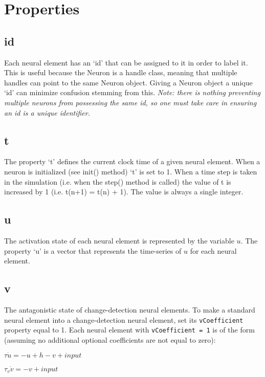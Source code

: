 \documentclass[phd, 12pt, doublespace, online]{fauthesis}
\begin{document}
\section{Properties}

\subsection{id}

Each neural element has an `id' that can be assigned to it in order to label it. This is useful because the Neuron is a handle class, meaning that multiple handles can point to the same Neuron object. Giving a Neuron object a unique `id' can minimize confusion stemming from this. \textit{Note: there is nothing preventing multiple neurons from possessing the same id, so one must take care in ensuring an id is a unique identifier.}

\subsection{t}

The property `t' defines the current clock time of a given neural element. When a neuron is initialized (see init() method) `t' is set to 1. When a time step is taken in the simulation (i.e. when the step() method is called) the value of t is increased by 1 (i.e. t(n+1) = t(n) + 1). The value is always a single integer. 

\subsection{u}

The activation state of each neural element is represented by the variable $u$. The property `u' is a vector that represents the time-series of $u$ for each neural element. 

\subsection{v}

The antagonistic state of change-detection neural elements. To make a standard neural element into a change-detection neural element, set its {\tt vCoefficient} property equal to 1. Each neural element with {\tt vCoefficient = 1} is of the form (assuming no additional optional coefficients are not equal to zero):

\bigskip
\noindent $ \tau \dot{u} = -u + h - v + input $

\noindent $ \tau_v \dot{v} = -v + input $
\end{document}
